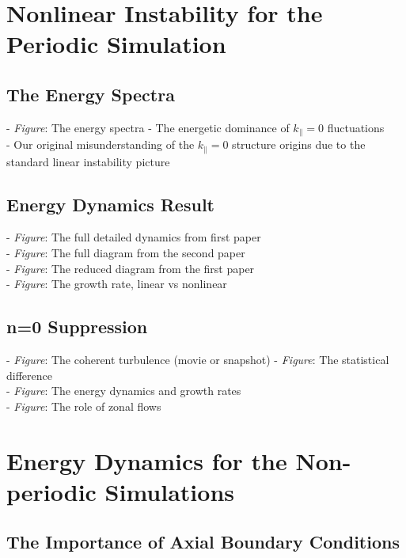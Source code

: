 \documentclass[12pt]{article}
\begin{document}
\section{Nonlinear Instability for the Periodic Simulation}

\subsection{The Energy Spectra}

- \emph{Figure}: The energy spectra
- The energetic dominance of $k_\parallel = 0$ fluctuations \\
- Our original misunderstanding of the $k_\parallel = 0$ structure origins due to the standard linear instability picture \\

\subsection{Energy Dynamics Result}

- \emph{Figure}: The full detailed dynamics from first paper \\
- \emph{Figure}: The full diagram from the second paper \\
- \emph{Figure}: The reduced diagram from the first paper \\
- \emph{Figure}: The growth rate, linear vs nonlinear \\

\subsection{n=0 Suppression}

- \emph{Figure}: The coherent turbulence (movie or snapshot) 
- \emph{Figure}: The statistical difference \\
- \emph{Figure}: The energy dynamics and growth rates \\
- \emph{Figure}: The role of zonal flows \\

\section{Energy Dynamics for the Non-periodic Simulations}

\subsection{The Importance of Axial Boundary Conditions}
\end{document}
